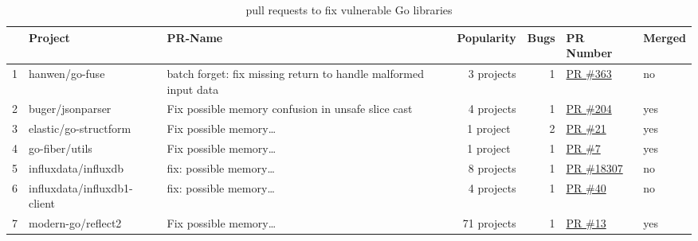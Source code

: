 \begin{table}[htp!]
    \centering
    \caption{\github{} pull requests to fix vulnerable Go libraries}
    \label{tbl:pull-requests}
    {\footnotesize
        \begin{tabularx}{\textwidth}{rlXrrll}
        {} & \textbf{Project}             & \textbf{PR-Name}                                                & \textbf{Popularity} & \textbf{Bugs} & \textbf{PR Number}                                                     & \textbf{Merged}  \\
        \hline
        1  & hanwen/go-fuse               & batch forget: fix missing return to handle malformed input data &  3 projects         &  1            & \href{https://www.github.com/hanwen/go-fuse/pull/363}{PR \#363}        & no               \\
        \rowcolor{verylightgray}
        2  & buger/jsonparser             & Fix possible memory confusion in unsafe slice cast              &  4 projects         &  1            & \href{https://www.github.com/buger/jsonparser/pull/204}{PR \#204}      & yes              \\
        3  & elastic/go-structform        & Fix possible memory\ldots                                       &  1 project~         &  2            & \href{https://github.com/elastic/go-structform/pull/21}{PR \#21}       & yes              \\
        \rowcolor{verylightgray}
        4  & go-fiber/utils               & Fix possible memory\ldots                                       &  1 project~         &  1            & \href{https://github.com/gofiber/utils/pull/7}{PR \#7}                 & yes              \\
        5  & influxdata/influxdb          & fix: possible memory\ldots                                      &  8 projects         &  1            & \href{https://github.com/influxdata/influxdb/pull/18307}{PR \#18307}   & no               \\
        \rowcolor{verylightgray}
        6  & influxdata/influxdb1-client  & fix: possible memory\ldots                                      &  4 projects         &  1            & \href{https://github.com/influxdata/influxdb1-client/pull/40}{PR \#40} & no               \\
        7  & modern-go/reflect2           & Fix possible memory\ldots                                       & 71 projects         &  1            & \href{https://github.com/modern-go/reflect2/pull/13}{PR \#13}          & yes              \\

\end{tabularx}}
\end{table}
